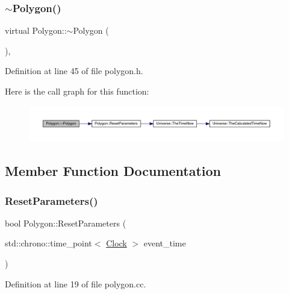 \subsubsection{\texorpdfstring{$\sim$\+Polygon()}{~Polygon()}}
{\footnotesize\ttfamily virtual Polygon\+::$\sim$\+Polygon (\begin{DoxyParamCaption}{ }\end{DoxyParamCaption})\hspace{0.3cm}{\ttfamily [inline]}, {\ttfamily [virtual]}}



Definition at line 45 of file polygon.\+h.

Here is the call graph for this function\+:\nopagebreak
\begin{figure}[H]
\begin{center}
\leavevmode
\includegraphics[width=350pt]{class_polygon_a873f9acee059f717277b6414102dab16_cgraph}
\end{center}
\end{figure}


\subsection{Member Function Documentation}
\mbox{\label{class_polygon_a0e2824d12cd6b18c8b14c64ef4b2bf97}} 
\subsubsection{\texorpdfstring{Reset\+Parameters()}{ResetParameters()}}
{\footnotesize\ttfamily bool Polygon\+::\+Reset\+Parameters (\begin{DoxyParamCaption}\item[{std\+::chrono\+::time\+\_\+point$<$ \hyperlink{universe_8h_a0ef8d951d1ca5ab3cfaf7ab4c7a6fd80}{Clock} $>$}]{event\+\_\+time }\end{DoxyParamCaption})}



Definition at line 19 of file polygon.\+cc.

